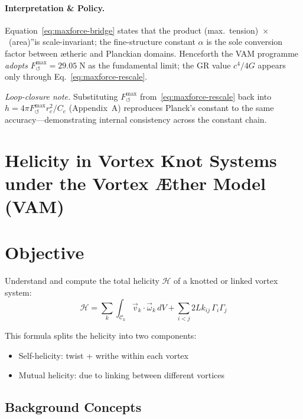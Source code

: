 \documentclass[a4paper,12pt]{article}
\begin{document}
    \paragraph{Interpretation \& Policy.} Equation~\eqref{eq:maxforce-bridge} states that the product \grqq(max.~tension)~$\times$~(area)\textquotedblright is scale-invariant; the fine-structure constant \(\alpha\) is the sole conversion factor between ætheric and Planckian domains.  Henceforth the VAM programme \emph{adopts} \(F^{\max}_{\!\boldsymbol{\circlearrowleft}}=29.05\;\mathrm{N}\) as the fundamental limit; the GR value \(c^{4}/4G\) appears only through Eq.~\eqref{eq:maxforce-rescale}.

    \smallskip
    \noindent\emph{Loop-closure note.}  Substituting \(F^{\max}_{\!\boldsymbol{\circlearrowleft}}\) from~\eqref{eq:maxforce-rescale} back into \(h=4\pi F^{\max}_{\!\boldsymbol{\circlearrowleft}}r_{c}^{2}/C_{e}\) (Appendix~A) reproduces    Planck's constant to the same accuracy—demonstrating internal consistency across the constant chain.


\section{Helicity in Vortex Knot Systems under the Vortex Æther Model (VAM)}\label{sec:calculate-knot-helicity}

    \section*{Objective}
    Understand and compute the total helicity $\mathcal{H}$ of a knotted or linked vortex system:
    \begin{equation}
        \boxed{
            \mathcal{H} = \sum_{k} \int_{\mathcal{C}_k} \vec{v}_k \cdot \vec{\omega}_k \, dV + \sum_{i<j} 2Lk_{ij} \, \Gamma_i \Gamma_j
        }
    \end{equation}

    This formula splits the helicity into two components:
    \begin{itemize}
        \item Self-helicity: twist + writhe within each vortex
        \item Mutual helicity: due to linking between different vortices
    \end{itemize}

    \subsection{ Background Concepts}
\end{document}
